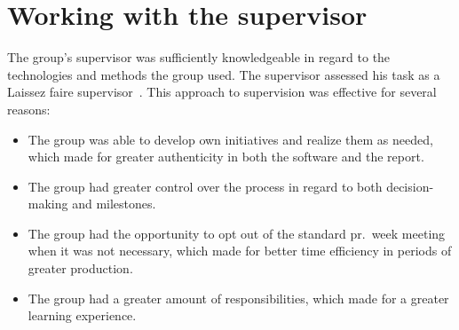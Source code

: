 \section{Working with the supervisor}\label{sec:working-with-the-supervisor}

The group's supervisor was sufficiently knowledgeable in regard to the technologies and methods the group used.
The supervisor assessed his task as a Laissez faire supervisor~\cite{PBL}.
This approach to supervision was effective for several reasons:

\begin{itemize}
    \item The group was able to develop own initiatives and realize them as needed, which made for greater authenticity
    in both the software and the report.
    \item The group had greater control over the process in regard to both decision-making and milestones.
    \item The group had the opportunity to opt out of the standard pr.\ week meeting when it was not necessary, which
    made for better time efficiency in periods of greater production.
    \item The group had a greater amount of responsibilities, which made for a greater learning experience.
\end{itemize}
